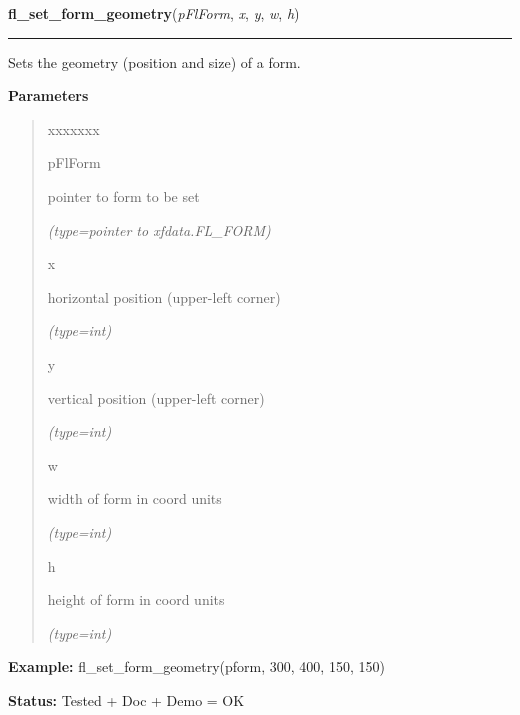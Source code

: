     \vspace{0.5ex}

\hspace{.8\funcindent}\begin{boxedminipage}{\funcwidth}

    \raggedright \textbf{fl\_set\_form\_geometry}(\textit{pFlForm}, \textit{x}, \textit{y}, \textit{w}, \textit{h})

    \vspace{-1.5ex}

    \rule{\textwidth}{0.5\fboxrule}
\setlength{\parskip}{2ex}
    Sets the geometry (position and size) of a form.

\setlength{\parskip}{1ex}
      \textbf{Parameters}
      \vspace{-1ex}

      \begin{quote}
        \begin{Ventry}{xxxxxxx}

          \item[pFlForm]

          pointer to form to be set

            {\it (type=pointer to xfdata.FL\_FORM)}

          \item[x]

          horizontal position (upper-left corner)

            {\it (type=int)}

          \item[y]

          vertical position (upper-left corner)

            {\it (type=int)}

          \item[w]

          width of form in coord units

            {\it (type=int)}

          \item[h]

          height of form in coord units

            {\it (type=int)}

        \end{Ventry}

      \end{quote}

\textbf{Example:} fl\_set\_form\_geometry(pform, 300, 400, 150, 150)



\textbf{Status:} Tested + Doc + Demo = OK



    \end{boxedminipage}

